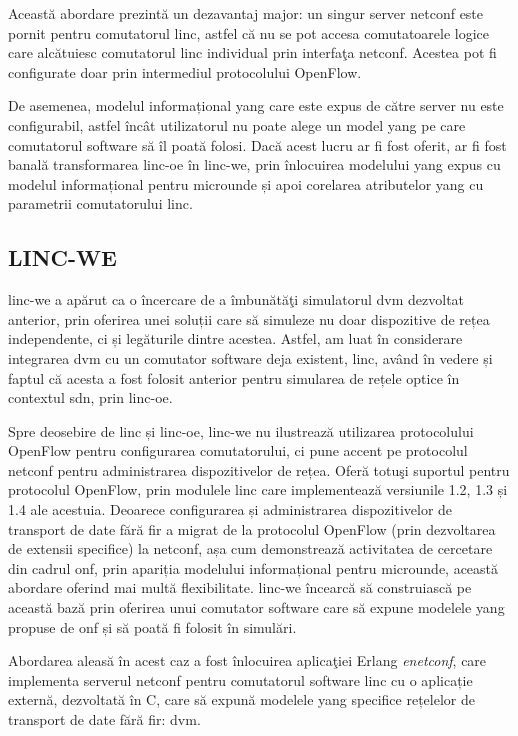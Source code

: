 Această abordare prezintă un dezavantaj major: un singur server \gls{netconf} este pornit pentru comutatorul \gls{linc}, astfel că nu se pot accesa comutatoarele logice care alcătuiesc comutatorul \gls{linc} individual prin interfaţa \gls{netconf}. Acestea pot fi configurate doar prin intermediul protocolului OpenFlow.

De asemenea, modelul informațional \gls{yang} care este expus de către server nu este configurabil, astfel încât utilizatorul nu poate alege un model \gls{yang} pe care comutatorul software să îl poată folosi. Dacă acest lucru ar fi fost oferit, ar fi fost banală transformarea \gls{linc-oe} în \gls{linc-we}, prin înlocuirea modelului \gls{yang} expus cu modelul informațional pentru microunde și apoi corelarea atributelor \gls{yang} cu parametrii comutatorului \gls{linc}.

\subsection{LINC-WE}

\gls{linc-we} a apărut ca o încercare de a îmbunătăţi simulatorul \gls{dvm} dezvoltat anterior, prin oferirea unei soluții care să simuleze nu doar dispozitive de rețea independente, ci și legăturile dintre acestea. Astfel, am luat în considerare integrarea \gls{dvm} cu un comutator software deja existent, \gls{linc}, având în vedere și faptul că acesta a fost folosit anterior pentru simularea de rețele optice în contextul \gls{sdn}, prin \gls{linc-oe}.

Spre deosebire de \gls{linc} și \gls{linc-oe}, \gls{linc-we} nu ilustrează utilizarea protocolului OpenFlow pentru configurarea comutatorului, ci pune accent pe protocolul \gls{netconf} pentru administrarea dispozitivelor de rețea. Oferă totuşi suportul pentru protocolul OpenFlow, prin modulele \gls{linc} care implementează versiunile 1.2, 1.3 și 1.4 ale acestuia. Deoarece configurarea și administrarea dispozitivelor de transport de date fără fir a migrat de la protocolul OpenFlow (prin dezvoltarea de extensii specifice) la \gls{netconf}, așa cum demonstrează activitatea de cercetare din cadrul \gls{onf}, prin apariția modelului informațional pentru microunde, această abordare oferind mai multă flexibilitate. \gls{linc-we} încearcă să construiască pe această bază prin oferirea unui comutator software care să expune modelele \gls{yang} propuse de \gls{onf} și să poată fi folosit în simulări.

Abordarea aleasă în acest caz a fost înlocuirea aplicaţiei Erlang \textit{enetconf}, care implementa serverul \gls{netconf} pentru comutatorul software \gls{linc} cu o aplicație externă, dezvoltată în C, care să expună modelele \gls{yang} specifice rețelelor de transport de date fără fir: \gls{dvm}.

